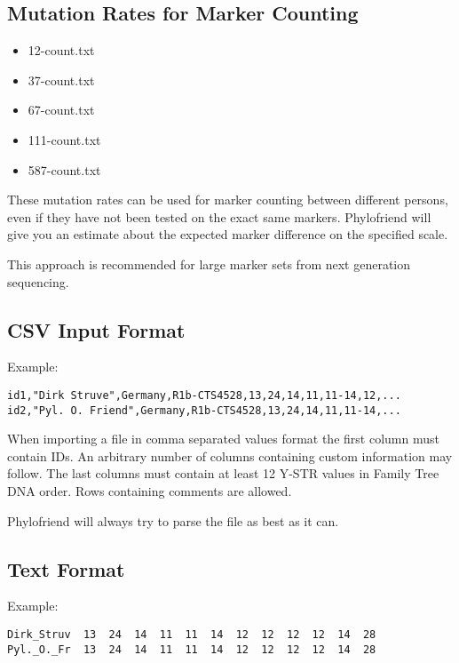 \subsection*{Mutation Rates for Marker Counting}

\begin{itemize}
\item 12-count.txt
\item 37-count.txt
\item 67-count.txt
\item 111-count.txt
\item 587-count.txt
\end{itemize}

These mutation rates can be used for marker counting between
different persons, even if they have not been tested on the exact
same markers. Phylofriend will give you an estimate about the
expected marker difference on the specified scale.

This approach is recommended for large marker sets from next
generation sequencing.


\subsection{CSV Input Format}

Example:

\begin{verbatim}
id1,"Dirk Struve",Germany,R1b-CTS4528,13,24,14,11,11-14,12,...
id2,"Pyl. O. Friend",Germany,R1b-CTS4528,13,24,14,11,11-14,...
\end{verbatim}

When importing a file in comma separated values format the
first column must contain IDs. An arbitrary number of columns
containing custom information may follow. The last columns
must contain at least 12 Y-STR values in Family Tree DNA order.
Rows containing comments are allowed.

Phylofriend will always try to parse the file as best as
it can.


\subsection{Text Format}

Example:

\begin{verbatim}
Dirk_Struv	13	24	14	11	11	14	12	12	12	12	14	28
Pyl._O._Fr	13	24	14	11	11	14	12	12	12	12	14	28
\end{verbatim}

